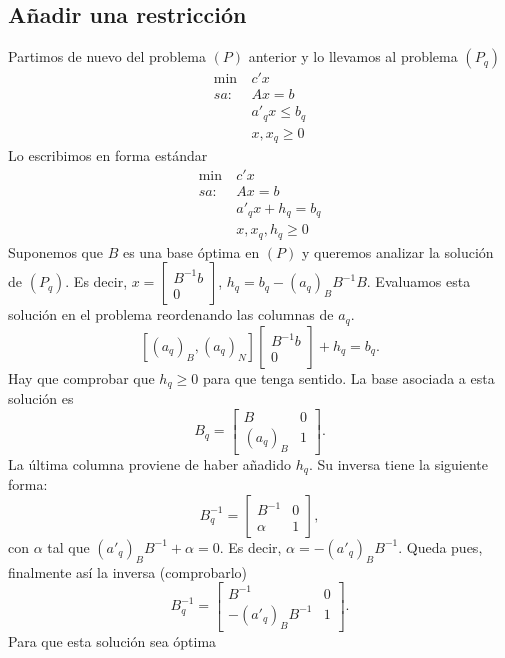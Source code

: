 \documentclass[PM.tex]{subfiles}
\begin{document}
\subsection{Añadir una restricción}
Partimos de nuevo del problema $(P)$ anterior y lo llevamos al problema $(P_q)$
\begin{align*}
\min\ & c'x\\
sa:\  & Ax=b\\
& a'_q x\leq b_q\\
 & x, x_q\geq 0
\end{align*}
Lo escribimos en forma estándar
\begin{align*}
\min\ & c'x\\
sa:\  & Ax=b\\
& a'_q x+h_q= b_q\\
 & x, x_q, h_q\geq 0
\end{align*}
Suponemos que $B$ es una base óptima en $(P)$ y queremos analizar la solución de $(P_q)$. Es decir, $x=\begin{bmatrix}
B^{-1}b\\
0\end{bmatrix}$, $h_q=b_q-(a_q)_B B^{-1}B$.  Evaluamos esta solución en el problema reordenando las columnas de $a_q$.
\[ [(a_q)_B, (a_q)_N]\begin{bmatrix}
B^{-1}b\\
0\end{bmatrix} +h_q=b_q.\] Hay que comprobar que $h_q\geq 0$ para que tenga sentido. La base asociada a esta solución es
\[ B_q=\begin{bmatrix}
B & 0\\
(a_q)_B & 1
\end{bmatrix}.\] La última columna proviene de haber añadido $h_q$. Su inversa tiene la siguiente forma:
\[ B_q^{-1}=\begin{bmatrix}
B^{-1} & 0\\
\alpha & 1
\end{bmatrix},\] con $\alpha$ tal que $(a'_q)_B B^{-1} +\alpha=0$. Es decir, $\alpha=-(a'_q)_B B^{-1}$. Queda pues, finalmente así la inversa (comprobarlo)
\[ B_q^{-1}=\begin{bmatrix}
B^{-1} & 0\\
-(a'_q)_B B^{-1} & 1
\end{bmatrix}.\]
Para que esta solución sea óptima 
\end{document}
